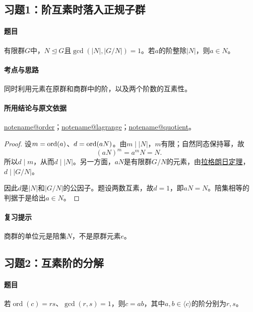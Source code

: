 \documentclass[UTF8,a4paper,11pt,fontset=windows]{ctexart}
\makeatletter
\newcommand{\noteref}[1]{\hyperref[note:#1]{\csname notename@#1\endcsname}}
\newcommand{\proofref}[2]{\hyperref[note:#1]{#2}}
\newcommand{\exref}[2]{\hyperref[ex:#1:#2]{第#1章习题#2}}
\makeatother
\begin{document}
\subsection{习题1：\texorpdfstring{阶互素时落入正规子群}{阶互素时落入正规子群}}
\label{ex:2:1}

\paragraph{题目}
有限群$G$中，$N\trianglelefteq G$且$\gcd(|N|,|G/N|)=1$。若$a$的阶整除$|N|$，则$a\in N$。

\paragraph{考点与思路}
同时利用元素在原群和商群中的阶，以及两个阶数的互素性。

\paragraph{所用结论与原文依据}
\noteref{order}；\noteref{lagrange}；\noteref{quotient}。


\begin{proof}
设$m=\operatorname{ord}(a)$、$d=\operatorname{ord}(aN)$。由$m\mid|N|$，$m$有限；自然同态保持幂，故
\[
(aN)^m=a^mN=N.
\]
所以$d\mid m$，从而$d\mid|N|$。另一方面，$aN$是有限群$G/N$的元素，由\proofref{lagrange}{拉格朗日定理}，$d\mid|G/N|$。

因此$d$是$|N|$和$|G/N|$的公因子。题设两数互素，故$d=1$，即$aN=N$。陪集相等的判据于是给出$a\in N$。
\end{proof}

\paragraph{复习提示}
商群的单位元是陪集$N$，不是原群元素$e$。


\subsection{习题2：\texorpdfstring{互素阶的分解}{互素阶的分解}}
\label{ex:2:2}

\paragraph{题目}
若$\operatorname{ord}(c)=rs$、$\gcd(r,s)=1$，则$c=ab$，其中$a,b\in\langle c\rangle$的阶分别为$r,s$。
\end{document}
